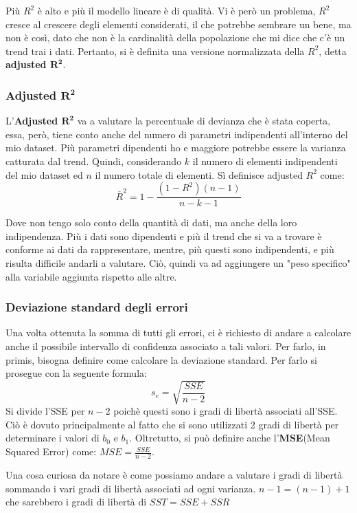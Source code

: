 Più \(R^2\) è alto e più il modello lineare è di qualità. Vi è però un problema, \(R^2\) cresce al crescere degli elementi considerati, il che potrebbe sembrare un bene, ma non è così, dato che non è la cardinalità della popolazione che mi dice che c'è un trend trai i dati. Pertanto, si è definita una versione normalizzata della \(R^2\), detta \textbf{adjusted \(\mathbf{R^2}\)}.

\subsubsection{Adjusted \(\mathbf{R^2}\)}
L'\textbf{Adjusted \(\mathbf{R^2}\)} va a valutare la percentuale di devianza che è stata coperta, essa, però, tiene conto anche del numero di parametri indipendenti all'interno del mio dataset. Più parametri dipendenti ho e maggiore potrebbe essere la varianza catturata dal trend. Quindi, considerando \(k\) il numero di elementi indipendenti del mio dataset ed \(n\) il numero totale di elementi. Sì definisce adjusted \(R^2\) come:
\[
\overline{R}^2 = 1 - \frac{(1 - R^2)(n-1)}{n-k-1}
\]

Dove non tengo solo conto della quantità di dati, ma anche della loro indipendenza. Più i dati sono dipendenti e più il trend che si va a trovare è conforme ai dati da rappresentare, mentre, più questi sono indipendenti, e più risulta difficile andarli a valutare. Ciò, quindi va ad aggiungere un "peso specifico" alla variabile aggiunta rispetto alle altre.

\subsubsection{Deviazione standard degli errori}
Una volta ottenuta la somma di tutti gli errori, ci è richiesto di andare a calcolare anche il possibile intervallo di confidenza associato a tali valori. Per farlo, in primis, bisogna definire come calcolare la deviazione standard. Per farlo si prosegue con la seguente formula:
\[
s_e = \sqrt{\frac{SSE}{n-2}}
\] 
Si divide l'SSE per \(n-2\) poichè questi sono i gradi di libertà associati all'SSE. Ciò è dovuto principalmente al fatto che si sono utilizzati 2 gradi di libertà per determinare i valori di \(b_0\) e \(b_1\). 
Oltretutto, si può definire anche l'\textbf{MSE}(Mean Squared Error) come: \(MSE = \frac{SSE}{n-2}\).

Una cosa curiosa da notare è come possiamo andare a valutare i gradi di libertà sommando i vari gradi di libertà associati ad ogni varianza. \(n-1 = (n-1) + 1\) che sarebbero i gradi di libertà di \(SST = SSE + SSR\)


